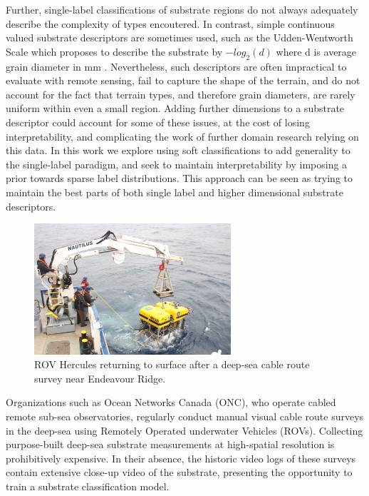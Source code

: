 Further, single-label classifications of substrate regions do not always adequately describe the complexity of types encoutered. In contrast, simple continuous valued substrate descriptors are sometimes used, such as the Udden-Wentworth Scale which proposes to describe the substrate by $-log_2(d)$ where d is average grain diameter in mm \citep{Krumbein1937}. Nevertheless, such descriptors are often impractical to evaluate with remote sensing, fail to capture the shape of the terrain, and do not account for the fact that terrain types, and therefore grain diameters, are rarely uniform within even a small region. Adding further dimensions to a substrate descriptor could account for some of these issues, at the cost of losing interpretability, and complicating the work of further domain research relying on this data. In this work we explore using soft classifications to add generality to the single-label paradigm, and seek to maintain interpretability by imposing a prior towards sparse label distributions. This approach can be seen as trying to maintain the best parts of both single label and higher dimensional substrate descriptors.

\begin{figure}
    \centering
    \includegraphics[width=0.65\textwidth]{figures/wacv/hercules}
    \caption{ROV Hercules returning to surface after a deep-sea cable route survey near Endeavour Ridge.}
    \label{fig:substrate-hercules}
\end{figure}
Organizations such as Ocean Networks Canada (ONC), who operate cabled remote sub-sea observatories, regularly conduct manual visual cable route surveys in the deep-sea using Remotely Operated underwater Vehicles (ROVs). Collecting purpose-built deep-sea substrate measurements at high-spatial resolution is prohibitively expensive. In their absence, the historic video logs of these surveys contain extensive close-up video of the substrate, presenting the opportunity to train a substrate classification model.

